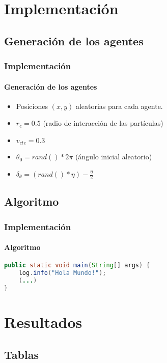 \documentclass[hyperref={pdfpagelayout=SinglePage}]{beamer}
\begin{document}
\section{Implementación}

\subsection{Generación de los agentes}

\begin{frame}
\frametitle{Implementación}
\framesubtitle{Generación de los agentes}
\begin{itemize}
	\item Posiciones $(x,y)$ aleatorias para cada agente.
	\item $r_{c} = 0.5$ (radio de interacción de las partículas)
	\item $v_{cte} = 0.3$
	\item $\theta_{0} = rand() * 2\pi$ (ángulo inicial aleatorio)
	\item $\delta_{\theta} = {(rand() * \eta) - \frac{\eta}{2}} $
\end{itemize}
\end{frame}

\subsection{Algoritmo}

\begin{frame}[fragile]
\frametitle{Implementación}
\framesubtitle{Algoritmo}

\begin{lstlisting}[language=Java, caption = Código]
public static void main(String[] args) {
	log.info("Hola Mundo!");
	(...)
}
\end{lstlisting}


\end{frame}

\section{Resultados}

\subsection{Tablas}
\end{document}
